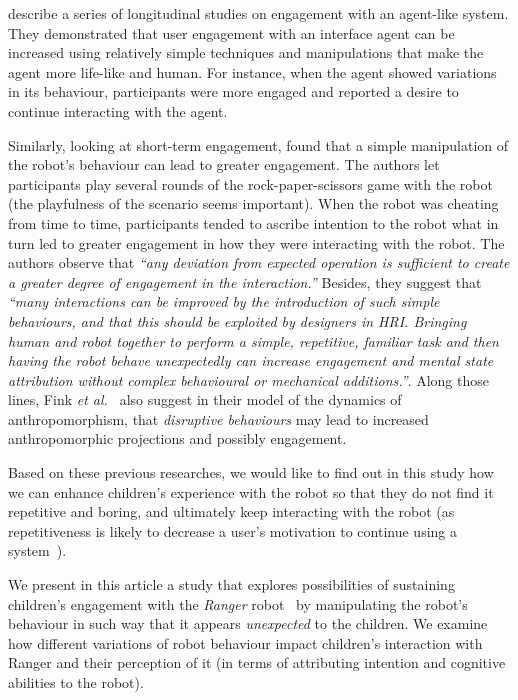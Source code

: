 \documentclass{sig-alternate}
\newcommand{\etal}{{\textit{et al.~}}}
\begin{document}
\cite{bickmore_maintaining_2010} describe a series of longitudinal studies on
engagement with an agent-like system. They demonstrated that user engagement
with an interface agent can be increased using relatively simple techniques and
manipulations that make the agent more life-like and human. For instance, when
the agent showed variations in its behaviour, participants were more engaged and
reported a desire to continue interacting with the agent.

Similarly, looking at short-term engagement, \cite{short_no_2010} found that a
simple manipulation of the robot's behaviour can lead to greater engagement. The
authors let participants play several rounds of the rock-paper-scissors game
with the robot (the playfulness of the scenario seems important). When the robot
was cheating from time to time, participants tended to ascribe intention to the
robot what in turn led to greater engagement in how they were interacting with
the robot. The authors observe that \textit{``any deviation from expected
operation is sufficient to create a greater degree of engagement in the
interaction.''} Besides, they suggest that \textit{``many interactions can be
improved by the introduction of such simple behaviours, and that this should
be exploited by designers in HRI. Bringing human and robot together to
perform a simple, repetitive, familiar task and then having the robot behave
unexpectedly can increase engagement and mental state attribution without
complex behavioural or mechanical additions.''}.  Along those lines, Fink
\etal\cite{fink2014dynamics} also suggest in their model of the dynamics of
anthropomorphism, that \emph{disruptive behaviours} may lead to increased
anthropomorphic projections and possibly engagement.

Based on these previous researches, we would like to find out in this study how
we can enhance children's experience with the robot so that they do not find it
repetitive and boring, and ultimately keep interacting with the robot (as
repetitiveness is likely to decrease a user's motivation to continue using a
system~\cite{bickmore_establishing_2005}).

We present in this article a study that explores possibilities of sustaining
children's engagement with the \emph{Ranger} robot~\cite{mondada2014ranger} by
manipulating the robot's behaviour in such way that it appears
\textit{unexpected} to the children. We examine how different variations of
robot behaviour impact children's interaction with Ranger and their perception of
it (in terms of attributing intention and cognitive abilities to the robot).
\end{document}

